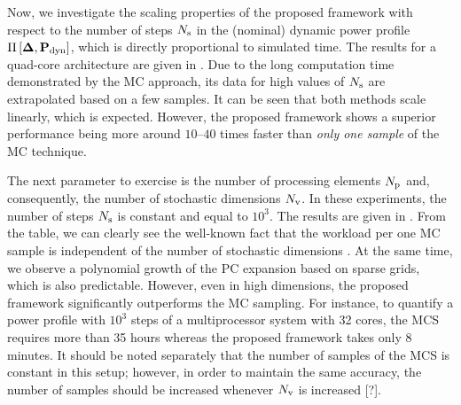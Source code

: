 
Now, we investigate the scaling properties of the proposed framework with respect to the number of steps $N_\text{s}$ in the (nominal) dynamic power profile $\prof{\mP_\dyn}$, which is directly proportional to simulated time. The results for a quad-core architecture are given in . Due to the long computation time demonstrated by the MC approach, its data for high values of $N_\text{s}$ are extrapolated based on a few samples. It can be seen that both methods scale linearly, which is expected. However, the proposed framework shows a superior performance being more around $10$--$40$ times faster than \emph{only one sample} of the MC technique.


The next parameter to exercise is the number of processing elements ${N_\text{p}}$ and, consequently, the number of stochastic dimensions ${N_\text{v}}$. In these experiments, the number of steps $N_\text{s}$ is constant and equal to $10^3$. The results are given in . From the table, we can clearly see the well-known fact that the workload per one MC sample is independent of the number of stochastic dimensions \cite{maitre2010}. At the same time, we observe a polynomial growth \cite{heiss2008} of the PC expansion based on sparse grids, which is also predictable. However, even in high dimensions, the proposed framework significantly outperforms the MC sampling. For instance, to quantify a power profile with $10^3$ steps of a multiprocessor system with 32 cores, the MCS requires more than 35 hours whereas the proposed framework takes only 8 minutes. It should be noted separately that the number of samples of the MCS is constant in this setup; however, in order to maintain the same accuracy, the number of samples should be increased whenever ${N_\text{v}}$ is increased [?].
